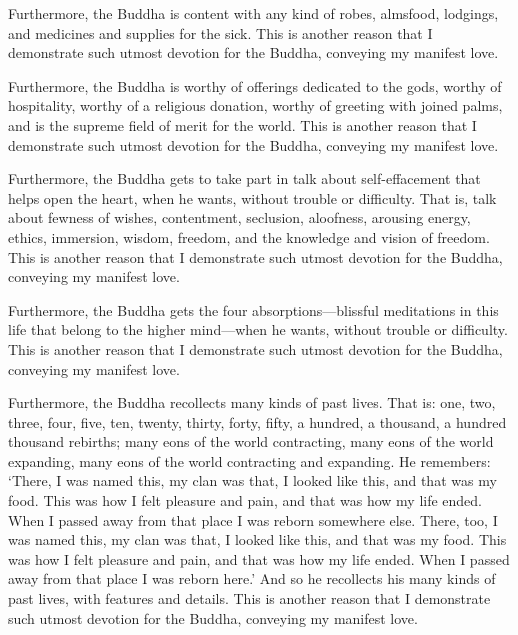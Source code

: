 \documentclass[12pt,openany]{book}%
\begin{document}
Furthermore, the Buddha is content with any kind of robes, almsfood, lodgings, and medicines and supplies for the sick. This is another reason that I demonstrate such utmost devotion for the Buddha, conveying my manifest love. 

Furthermore, the Buddha is worthy of offerings dedicated to the gods, worthy of hospitality, worthy of a religious donation, worthy of greeting with joined palms, and is the supreme field of merit for the world. This is another reason that I demonstrate such utmost devotion for the Buddha, conveying my manifest love. 

Furthermore, the Buddha gets to take part in talk about self-effacement that helps open the heart, when he wants, without trouble or difficulty. That is, talk about fewness of wishes, contentment, seclusion, aloofness, arousing energy, ethics, immersion, wisdom, freedom, and the knowledge and vision of freedom. This is another reason that I demonstrate such utmost devotion for the Buddha, conveying my manifest love. 

Furthermore, the Buddha gets the four absorptions—blissful meditations in this life that belong to the higher mind—when he wants, without trouble or difficulty. This is another reason that I demonstrate such utmost devotion for the Buddha, conveying my manifest love. 

Furthermore, the Buddha recollects many kinds of past lives. That is: one, two, three, four, five, ten, twenty, thirty, forty, fifty, a hundred, a thousand, a hundred thousand rebirths; many eons of the world contracting, many eons of the world expanding, many eons of the world contracting and expanding. He remembers: ‘There, I was named this, my clan was that, I looked like this, and that was my food. This was how I felt pleasure and pain, and that was how my life ended. When I passed away from that place I was reborn somewhere else. There, too, I was named this, my clan was that, I looked like this, and that was my food. This was how I felt pleasure and pain, and that was how my life ended. When I passed away from that place I was reborn here.’ And so he recollects his many kinds of past lives, with features and details. This is another reason that I demonstrate such utmost devotion for the Buddha, conveying my manifest love. 
\end{document}
